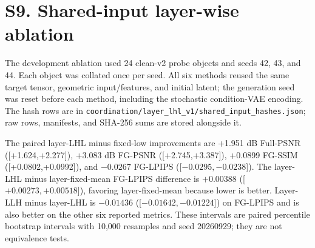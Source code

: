 \documentclass[10pt]{article}
\begin{document}
\section{S9. Shared-input layer-wise ablation}

The development ablation used 24 clean-v2 probe objects and seeds 42, 43, and
44. Each object was collated once per seed. All six methods reused the same
target tensor, geometric input/features, and initial latent; the generation
seed was reset before each method, including the stochastic condition-VAE
encoding. The hash rows are in
\texttt{coordination/layer\_lhl\_v1/shared\_input\_hashes.json}; raw rows,
manifests, and SHA-256 sums are stored alongside it.

\begin{table}[h]
\centering\scriptsize
\caption{Shared-input development ablation. Means are over 72 object-seed
pairs. Lower is better for LPIPS.}
\end{table}

The paired layer-LHL minus fixed-low improvements are +1.951 dB Full-PSNR
([+1.624,+2.277]), +3.083 dB FG-PSNR ([+2.745,+3.387]), +0.0899 FG-SSIM
([+0.0802,+0.0992]), and $-0.0267$ FG-LPIPS
([$-0.0295,-0.0238$]). The layer-LHL minus layer-fixed-mean FG-LPIPS
difference is $+0.00388$ ([$+0.00273,+0.00518$]), favoring layer-fixed-mean
because lower is better. Layer-LLH minus layer-LHL is $-0.01436$
([$-0.01642,-0.01224$]) on FG-LPIPS and is also better on the other six
reported metrics. These intervals are paired percentile bootstrap intervals
with 10,000 resamples and seed 20260929; they are not equivalence tests.
\end{document}
